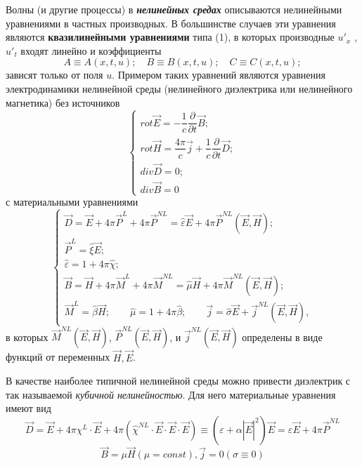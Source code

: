 \documentclass[a4paper]{article}
\begin{document}
\begin{itemize}
	Волны (и другие процессы) в \textbf{\textit{нелинейных средах}} описываются нелинейными уравнениями в частных производных. В большинстве случаев эти уравнения являются \textbf{квазилинейными уравнениями} типа  (1), в которых производные $u'_{x}$ , $u'_{t}$  входят линейно и коэффициенты 
	\begin{equation}
		A\equiv A(x,t,u);\quad B\equiv B(x,t,u);\quad C\equiv C(x,t,u);
	\end{equation}
	зависят только от поля $u$. Примером таких уравнений являются уравнения электродинамики нелинейной среды (нелинейного диэлектрика или нелинейного магнетика) без источников 
	\begin{equation}\label{4}
		\begin{cases}
			rot\vec{E}=-\dfrac{1}{c}\dfrac{\partial}{\partial t}\vec{B};\\
			rot\vec{H}=\dfrac{4\pi}{c}\vec{j}+\dfrac{1}{c}\dfrac{\partial}{\partial t}\vec{D};\\
			div\vec{D}=0;\\
			div\vec{B}=0
		\end{cases}
	\end{equation}
	с материальными уравнениями
	\begin{equation}
		\begin{cases}
		\vec{D}=\vec{E}+4\pi\vec{P}^{L}+4\pi\vec{P}^{NL}=\hat\varepsilon\vec{E}+4\pi\vec{P}^{NL}(\vec{E},\vec{H});\\
		\vec{P}^{L}=\hat{\xi}\vec{E};\\
		\hat{\varepsilon}=1+4\pi\hat{\chi};\\
		\vec{B}=\vec{H}+4\pi\vec{M}^{L}+4\pi\vec{M}^{NL}=\hat{\mu}\vec{H}+4\pi\vec{M}^{NL}(\vec{E},\vec{H});\\
		\vec{M}^{L}=\hat{\beta}\vec{H};\qquad\hat{\mu}=1+4\pi\hat{\beta};\qquad\vec{j}=\hat{\sigma}\vec{E}+\vec{j}^{NL}\left(\vec{E},\vec{H}\right),	
		\end{cases}
	\end{equation}
в которых $\vec{M}^{NL}(\vec{E},\vec{H})$, $\vec{P}^{NL}(\vec{E},\vec{H})$, и $\vec{j}^{NL}\left(\vec{E},\vec{H}\right)$ определены в виде функций от переменных $\vec{H},\vec{E}$.
\end{itemize}
\newpage
В качестве наиболее типичной нелинейной среды можно привести диэлектрик с так называемой \textit{кубичной нелинейностью}. Для него материальные уравнения имеют вид 
\begin{equation}
	\vec{D}=\vec{E}+4\pi\chi^{L}\cdot\vec{E}+4\pi\left(\hat{\chi}^{NL}\cdot\vec{E}\cdot\vec{E}\cdot\vec{E}\right)\equiv\left(\varepsilon+\alpha\left|\vec{E}\right|^{2}\right)\vec{E}=\varepsilon\vec{E}+4\pi\vec{P}^{NL}\tag*{(5')}
\end{equation}
$$\vec{B}=\mu\vec{H} (\mu=const), \vec{j}=0 (\sigma\equiv0)$$
\end{document}
